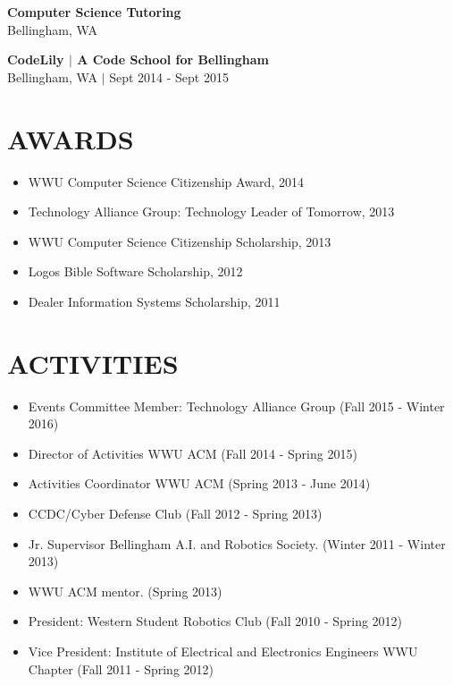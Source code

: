 \documentclass[line,margin]{res}
\begin{document}
\begin{resume}
    {\bf Computer Science Tutoring} \\
    {\footnotesize Bellingham, WA}

    {\bf CodeLily $|$ A Code School for Bellingham} \\
    {\footnotesize Bellingham, WA $|$ Sept 2014 - Sept 2015}
    
\section{AWARDS}
    \begin{itemize} \itemsep -3pt
        \item WWU Computer Science Citizenship Award, 2014
        \item Technology Alliance Group: Technology Leader of Tomorrow, 2013
        \item WWU Computer Science Citizenship Scholarship, 2013
        \item Logos Bible Software Scholarship, 2012
        \item Dealer Information Systems Scholarship, 2011
    \end{itemize}

\section{ACTIVITIES} 
    \begin{itemize} \itemsep -3pt
    \item Events Committee Member: Technology Alliance Group {\footnotesize (Fall 2015 - Winter 2016)}
    \item Director of Activities WWU ACM {\footnotesize (Fall 2014 - Spring 2015)}
    \item Activities Coordinator WWU ACM {\footnotesize (Spring 2013 - June 2014)}
    \item CCDC/Cyber Defense Club {\footnotesize (Fall 2012 - Spring 2013)}
    \item Jr. Supervisor Bellingham A.I. and Robotics Society. {\footnotesize (Winter 2011 - Winter 2013)}
    \item WWU ACM mentor. {\footnotesize (Spring 2013)}
    \item President: Western Student Robotics Club {\footnotesize(Fall 2010 - Spring 2012)}
    \item Vice President: Institute of Electrical and Electronics Engineers WWU Chapter {\footnotesize(Fall 2011 - Spring 2012)}
    \end{itemize}
    
\end{resume}
\end{document}
